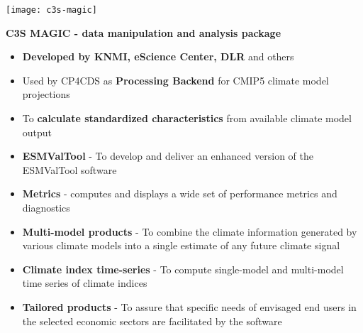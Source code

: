 \documentclass[landscape,a0paper,fontscale=0.4]{baposter} %
\newcommand{\compresslist}{%
\setlength{\itemsep}{1pt}%
\setlength{\parskip}{0pt}%
\setlength{\parsep}{0pt}%
}
\begin{document}
\begin{poster}
{  \begin{minipage}{0.4\textwidth}
    \texttt{[image: c3s-magic]}
  \end{minipage}
  \begin{minipage}{0.6\textwidth}
    {\bf C3S MAGIC - data manipulation and analysis package}
    \begin{itemize}\compresslist
      \item {\bf Developed by KNMI, eScience Center, DLR} and others
      \item Used by CP4CDS as {\bf Processing Backend} for CMIP5 climate model projections
      \item To {\bf calculate standardized characteristics}
          from available climate model output
      \item {\bf ESMValTool} - To develop and deliver an enhanced version of the ESMValTool software
      \item {\bf Metrics} - computes and displays a wide set of performance metrics and diagnostics
      \item {\bf Multi-model products} - To combine the climate information generated by various climate models
        into a single estimate of any future climate signal
      \item {\bf Climate index time-series} - To compute single-model and multi-model time series of climate indices
      \item {\bf Tailored products} - To assure that specific needs of envisaged end users in the selected economic
        sectors
        are facilitated by the software
    \end{itemize}
 \end{minipage}

}

\end{poster}
\end{document}
